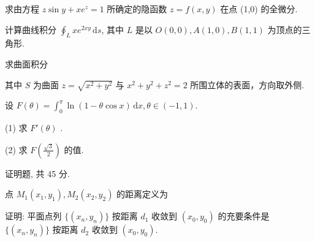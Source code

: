 求由方程 $z \sin y + xe^z = 1$ 所确定的隐函数 $z = f(x, y)$ 在点 (1,0) 的全微分.\par
计算曲线积分 $\oint_{L} x e^{2xy} \, \mathrm{d}s$, 其中 $L$ 是以 $O(0,0), A(1,0), B(1,1)$ 为顶点的三角形.\par
\par{}
求曲面积分\par
\nopagebreak[4]
其中 $S$ 为曲面 $z = \sqrt{x^2 + y^2}$ 与 $x^{2} + y^{2} + z^{2} = 2$ 所围立体的表面，方向取外侧.\par
设 $F(\theta) = \int_{0}^{\pi} \ln(1 - \theta \cos x) \, \mathrm{d}x, \theta \in (-1, 1)$.\par
(1) 求  $F'(\theta)$ .\par
(2) 求 $F\left(\frac{\sqrt{3}}{2}\right)$ 的值.\par
\par{}
证明题, 共 45 分.\par
\par{}
点 $M_{1}(x_{1}, y_{1}), M_{2}(x_{2}, y_{2})$ 的距离定义为\par
\nopagebreak[4]
证明: 平面点列 $\{(x_{n}, y_{n})\}$ 按距离 $d_{1}$ 收敛到 $(x_{0}, y_{0})$ 的充要条件是 $\{(x_{n}, y_{n})\}$ 按距离 $d_{2}$ 收敛到 $(x_{0}, y_{0})$.\par
